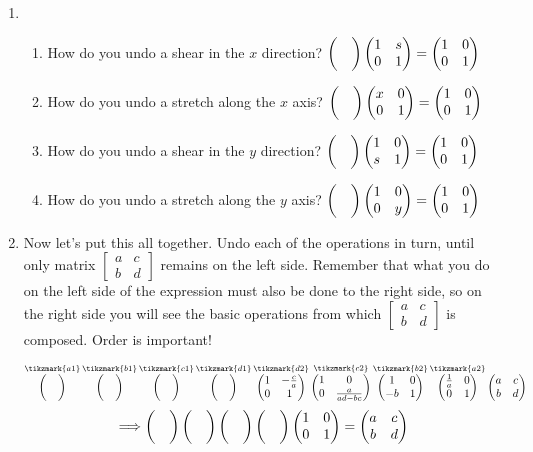 \documentclass[../gatm_answers.tex]{subfiles}
\begin{document}
\begin{enumerate}
\setcounter{enumi}{\value{problem_i}}
\item \begin{enumerate}
\item How do you undo a shear in the $x$ direction?
$\begin{pmatrix}  &  \\  &  \end{pmatrix}\begin{pmatrix} 1 & s \\ 0 & 1 \end{pmatrix}=\begin{pmatrix} 1 & 0 \\ 0 & 1 \end{pmatrix}$
\item How do you undo a stretch along the $x$ axis?
$\begin{pmatrix}  &  \\  &  \end{pmatrix}\begin{pmatrix} x & 0 \\ 0 & 1 \end{pmatrix}=\begin{pmatrix} 1 & 0 \\ 0 & 1 \end{pmatrix}$
\item How do you undo a shear in the $y$ direction?
$\begin{pmatrix}  &  \\  &  \end{pmatrix}\begin{pmatrix} 1 & 0 \\ s & 1 \end{pmatrix}=\begin{pmatrix} 1 & 0 \\ 0 & 1 \end{pmatrix}$
\item How do you undo a stretch along the $y$ axis?
$\begin{pmatrix}  &  \\  &  \end{pmatrix}\begin{pmatrix} 1 & 0 \\ 0 & y \end{pmatrix}=\begin{pmatrix} 1 & 0 \\ 0 & 1 \end{pmatrix}$
\end{enumerate}

\item Now let's put this all together. Undo each of the operations in turn, until only matrix $\left[\begin{smallmatrix}a & c \\ b & d \end{smallmatrix}\right]$ remains on the left side. Remember that what you do on the left side of the expression must also be done to the right side, so on the right side you will see the basic operations from which $\left[\begin{smallmatrix}a & c \\ b & d \end{smallmatrix}\right]$ is composed. Order is important!

\vspace{1.5cm}
$$\mathop{\twomat{}{}{}{}}^{\tikzmark{a1}}
\mathop{\twomat{}{}{}{}}^{\tikzmark{b1}}
\mathop{\twomat{}{}{}{}}^{\tikzmark{c1}}
\mathop{\twomat{}{}{}{}}^{\tikzmark{d1}}
\mathop{\twomat{1}{-\frac{c}{a}}{0}{1}}^{\tikzmark{d2}}
\mathop{\twomat{1}{0}{0}{\frac{a}{ad-bc}}}^{\tikzmark{c2}}
\mathop{\twomat{1}{0}{-b}{1}}^{\tikzmark{b2}}
\mathop{\twomat{\frac{1}{a}}{0}{0}{1}}^{\tikzmark{a2}}
\twomat{a}{c}{b}{d}$$
$$\Longrightarrow \begin{pmatrix}  &  \\  &  \end{pmatrix}\begin{pmatrix}  &  \\  &  \end{pmatrix}\begin{pmatrix}  &  \\  &  \end{pmatrix}\begin{pmatrix}  &  \\  &  \end{pmatrix}\begin{pmatrix} 1 & 0 \\ 0 & 1 \end{pmatrix} = \begin{pmatrix} a & c \\ b & d \end{pmatrix}$$

\setcounter{problem_i}{\value{enumi}}
\end{enumerate}
\end{document}
